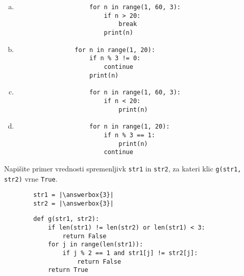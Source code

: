 \documentclass[arhiv, 10pt]{../izpit}
\newcommand{\inlinepy}[1]{\texttt{#1}}
\newcommand{\answerbox}[1]{\framebox{\vphantom{\large M}\hspace{#1cm}}}
\begin{document}
        \begin{multicols}{2}
        \begin{enumerate}[(a)]
\item 
                \begin{verbatim}
                    for n in range(1, 60, 3):
                        if n > 20:
                            break
                        print(n)
                \end{verbatim}
            
\item 
            \begin{verbatim}
                for n in range(1, 20):
                    if n % 3 != 0:
                        continue
                    print(n)
            \end{verbatim}
        
\item 
                \begin{verbatim}
                    for n in range(1, 60, 3):
                        if n < 20:
                            print(n)
                \end{verbatim}
            
\item 
                \begin{verbatim}
                    for n in range(1, 20):
                        if n % 3 == 1:
                            print(n)
                        continue
                \end{verbatim}
            
\end{enumerate}

        \end{multicols}
    
        \naloga*
        \begin{multicols}{2}
        \noindent
        Napišite primer vrednosti spremenljivk \inlinepy{str1} in \inlinepy{str2}, za kateri klic \inlinepy{g(str1, str2)} vrne \inlinepy{True}.
        \begin{verbatim}
        str1 = |\answerbox{3}|
        str2 = |\answerbox{3}|
        \end{verbatim}
        \vfil
        \columnbreak
        \begin{verbatim}
        def g(str1, str2):
            if len(str1) != len(str2) or len(str1) < 3:
                return False
            for j in range(len(str1)):
                if j % 2 == 1 and str1[j] != str2[j]:
                    return False
            return True
        \end{verbatim}
        \end{multicols}
    
\end{document}

